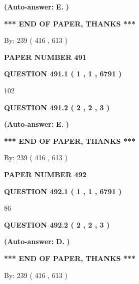\documentclass[12pt]{article}
\begin{document}
 
{\textbf{(Auto-answer:}}
{\textbf{\large{
E.}}}
{\textbf{)}}
 
 
   
   
   
   
\vspace{1.0in} 
{\textbf{\large{ *** END OF PAPER, THANKS *** }}} 
   
   
\hspace{1.0in} By: 
 239 ( 416 ,  613 )
   
   
   
   
\newpage 
\setcounter{page}{ 
   491001 } 
   
   
 {\textbf{ \Large{ PAPER NUMBER  491  }}}
   
   
   
   
  
  
{\textbf{\large{QUESTION
491.1 
 ( 1 , 1 , 6791 )
}}}

102
  
  
{\textbf{\large{QUESTION
491.2 
 ( 2 , 2 , 3 )
}}}
 
 
{\textbf{(Auto-answer:}}
{\textbf{\large{
E.}}}
{\textbf{)}}
 
 
   
   
   
   
\vspace{1.0in} 
{\textbf{\large{ *** END OF PAPER, THANKS *** }}} 
   
   
\hspace{1.0in} By: 
 239 ( 416 ,  613 )
   
   
   
   
\newpage 
\setcounter{page}{ 
   492001 } 
   
   
 {\textbf{ \Large{ PAPER NUMBER  492  }}}
   
   
   
   
  
  
{\textbf{\large{QUESTION
492.1 
 ( 1 , 1 , 6791 )
}}}

86
  
  
{\textbf{\large{QUESTION
492.2 
 ( 2 , 2 , 3 )
}}}
 
 
{\textbf{(Auto-answer:}}
{\textbf{\large{
D.}}}
{\textbf{)}}
 
 
   
   
   
   
\vspace{1.0in} 
{\textbf{\large{ *** END OF PAPER, THANKS *** }}} 
   
   
\hspace{1.0in} By: 
 239 ( 416 ,  613 )
   
   
   
\end{document}
